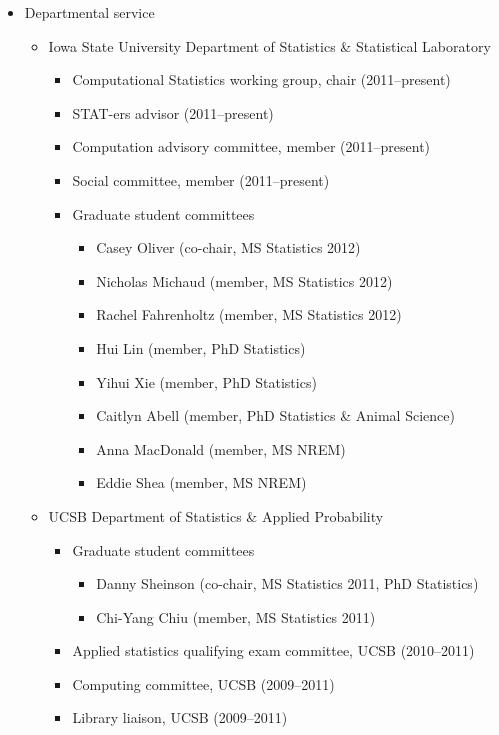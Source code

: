 \documentclass[overlapped,line,letterpaper]{res}
\begin{document}
\begin{resume}
\begin{itemize}
\item Departmental service
 	\begin{itemize}
	\item Iowa State University Department of Statistics \& Statistical Laboratory
		\begin{itemize}
		\item Computational Statistics working group, chair (2011--present)
		\item STAT-ers advisor (2011--present)
		\item Computation advisory committee, member (2011--present)
		\item Social committee, member (2011--present)

		\item Graduate student committees
			\begin{itemize}
			\item Casey Oliver (co-chair, MS Statistics 2012)
            \item Nicholas Michaud (member, MS Statistics 2012)
            \item Rachel Fahrenholtz (member, MS Statistics 2012)
			\item Hui Lin (member, PhD Statistics)
			\item Yihui Xie (member, PhD Statistics)
			\item Caitlyn Abell (member, PhD Statistics \& Animal Science)
			\item Anna MacDonald (member, MS NREM)
			\item Eddie Shea (member, MS NREM)
			\end{itemize}
		\end{itemize}
	\item UCSB Department of Statistics \& Applied Probability
		\begin{itemize}
		\item Graduate student committees
			\begin{itemize}
			\item Danny Sheinson (co-chair, MS Statistics 2011, PhD Statistics)
			\item Chi-Yang Chiu (member, MS Statistics 2011)
			\end{itemize}
		\item Applied statistics qualifying exam committee, UCSB (2010--2011)
		\item Computing committee, UCSB (2009--2011)
		\item Library liaison, UCSB (2009--2011)
		\end{itemize}
 	\end{itemize}
\end{itemize}



\end{resume}
\end{document}
